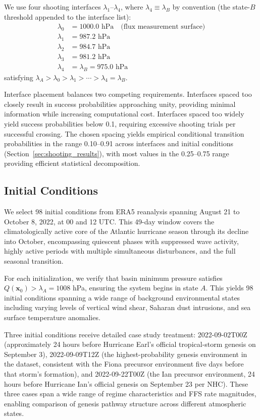 \documentclass[11pt]{article}
\begin{document}
We use four shooting interfaces $\lambda_1$--$\lambda_4$, where $\lambda_4 \equiv \lambda_B$ by convention (the state-$B$ threshold appended to the interface list):
\begin{align}
\lambda_0 &= 1000.0 \text{ hPa} \quad \text{(flux measurement surface)} \\
\lambda_1 &= 987.2 \text{ hPa} \\
\lambda_2 &= 984.7 \text{ hPa} \\
\lambda_3 &= 981.2 \text{ hPa} \\
\lambda_4 &= \lambda_B = 975.0 \text{ hPa}
\end{align}
satisfying $\lambda_A > \lambda_0 > \lambda_1 > \cdots > \lambda_4 = \lambda_B$.

Interface placement balances two competing requirements. Interfaces spaced too closely result in success probabilities approaching unity, providing minimal information while increasing computational cost. Interfaces spaced too widely yield success probabilities below 0.1, requiring excessive shooting trials per successful crossing. The chosen spacing yields empirical conditional transition probabilities in the range 0.10--0.91 across interfaces and initial conditions (Section~\ref{sec:shooting_results}), with most values in the 0.25--0.75 range providing efficient statistical decomposition.

\subsection{Initial Conditions}

We select 98 initial conditions from ERA5 reanalysis spanning August 21 to October 8, 2022, at 00 and 12 UTC. This 49-day window covers the climatologically active core of the Atlantic hurricane season through its decline into October, encompassing quiescent phases with suppressed wave activity, highly active periods with multiple simultaneous disturbances, and the full seasonal transition.

For each initialization, we verify that basin minimum pressure satisfies $Q(\mathbf{x}_0) > \lambda_A = 1008$ hPa, ensuring the system begins in state $A$. This yields 98 initial conditions spanning a wide range of background environmental states including varying levels of vertical wind shear, Saharan dust intrusions, and sea surface temperature anomalies.

Three initial conditions receive detailed case study treatment: 2022-09-02T00Z (approximately 24 hours before Hurricane Earl's official tropical-storm genesis on September 3), 2022-09-09T12Z (the highest-probability genesis environment in the dataset, consistent with the Fiona precursor environment five days before that storm's formation), and 2022-09-22T00Z (the Ian precursor environment, 24 hours before Hurricane Ian's official genesis on September 23 per NHC). These three cases span a wide range of regime characteristics and FFS rate magnitudes, enabling comparison of genesis pathway structure across different atmospheric states.
\end{document}
